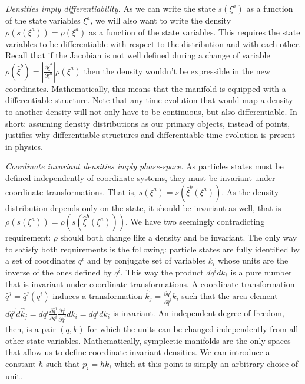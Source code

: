 \documentclass[twocolumn]{article}
\begin{document}
\emph{Densities imply differentiability.} As we can write the state $s(\xi^a)$ as a function of the state variables $\xi^a$, we will also want to write the density $\rho(s(\xi^a)) = \rho(\xi^a)$ as a function of the state variables. This requires the state variables to be differentiable with respect to the distribution and with each other. Recall that if the Jacobian is not well defined during a change of variable $\rho(\hat{\xi}^b) = \left|\frac{\partial \hat{\xi}^b}{\partial \xi^a}\right| \rho(\xi^a)$ then the density wouldn't be expressible in the new coordinates. Mathematically, this means that the manifold is equipped with a differentiable structure. Note that any time evolution that would map a density to another density will not only have to be continuous, but also differentiable. In short: assuming density distributions as our primary objects, instead of points, justifies why differentiable structures and differentiable time evolution is present in physics.

\emph{Coordinate invariant densities imply phase-space.} As particles states must be defined independently of coordinate systems, they must be invariant under coordinate transformations. That is, $s(\xi^a) = s(\hat{\xi}^b(\xi^a))$. As the density distribution depends only on the state, it should be invariant as well, that is $\rho(s(\xi^a)) = \rho(s(\hat{\xi}^b(\xi^a)))$. We have two seemingly contradicting requirement: $\rho$ should both change like a density and be invariant. The only way to satisfy both requirements is the following: particle states are fully identified by a set of coordinates $q^i$ and by conjugate set of variables $k_i$ whose units are the inverse of the ones defined by $q^i$. This way the product $dq^i dk_i$ is a pure number that is invariant under coordinate transformations. A coordinate transformation $\hat{q}^j = \hat{q}^j (q^i)$ induces a transformation $\hat{k}_j = \frac{\partial q^i }{\partial \hat{q}^j} k_i$ such that the area element $d\hat{q}^j d\hat{k}_j = dq^i \frac{\partial \hat{q}^j }{\partial q^i} \frac{\partial q^i }{\partial \hat{q}^j} dk_i=dq^i dk_i$ is invariant. An independent degree of freedom, then, is a pair $(q,k)$ for which the units can be changed independently from all other state variables. Mathematically, symplectic manifolds are the only spaces that allow us to define coordinate invariant densities. We can introduce a constant $\hbar$ such that $p_i = \hbar k_i$ which at this point is simply an arbitrary choice of unit.
\end{document}
